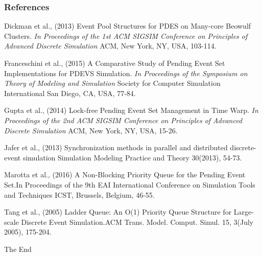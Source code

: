 \documentclass[table]{beamer}
\begin{document}
\begin{frame}
\frametitle{References}
\footnotesize{
\begin{thebibliography}{99}\vspace*{-3.5mm}
 Dickman et al., (2013) Event Pool Structures for PDES on Many-core Beowulf Clusters. \emph{In Proceedings of the 1st ACM SIGSIM Conference on Principles of Advanced Discrete Simulation} ACM, New York, NY, USA, 103-114.

 Franceschini et al., (2015) A Comparative Study of Pending Event Set Implementations for PDEVS Simulation. \emph{In Proceedings of the Symposium on Theory of Modeling and Simulation} Society for Computer Simulation International San Diego, CA, USA, 77-84.

 Gupta et al., (2014) Lock-free Pending Event Set Management in Time Warp. \emph{In Proceedings of the 2nd ACM SIGSIM Conference on Principles of Advanced Discrete Simulation} ACM, New York, NY, USA, 15-26.

 Jafer et al., (2013) Synchronization methods in parallel and distributed discrete-event simulation{ Simulation Modeling Practice and Theory} 30(2013), 54-73.

 Marotta et al., (2016) A Non-Blocking Priority Queue for the Pending Event Set.{In Proceedings of the 9th EAI International Conference on Simulation Tools and Techniques} ICST, Brussels, Belgium, 46-55.

 Tang et al., (2005) Ladder Queue: An O(1) Priority Queue Structure for Large-scale Discrete Event Simulation.{ACM Trans. Model. Comput. Simul.} 15, 3(July 2005), 175-204.
\end{thebibliography}
}
\end{frame}


\begin{frame}
\Huge{\centerline{The End}}
\end{frame}
\end{document}
